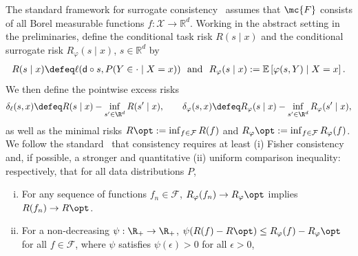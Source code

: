 \documentclass[11pt]{article}
\newcommand{\brk}[1]{\left[{#1}\right]} %
\newcommand{\pred}{\mathsf{d}}  %
\newcommand{\dstr}{P}
\newcommand{\tloss}{\ell}  %
\newcommand{\sloss}{\varphi}  %
\newcommand{\extloss}{\delta_\tloss}
\newcommand{\exsloss}{\delta_\sloss}
\begin{document}
The standard framework for surrogate consistency~\citep{Steinwart07}
assumes that $\mc{F}$ consists of all Borel
measurable functions $f: \mathcal{X} \to \mathbb{R}^d$.
%
%
Working in the abstract setting in the preliminaries, define the
conditional task risk $R(s \mid x)$ and the conditional surrogate risk
$R_\sloss(s \mid x)$, $s \in \mathbb{R}^d$ by
\begin{align*}
  R(s \mid x)
  \defeq \tloss(\pred \circ s, P(Y \in \cdot \mid X = x))
  ~~ \mbox{and} ~~
  R_\sloss(s \mid x) := \mathbb{E}\brk{\sloss(s, Y) \mid X = x}.
\end{align*}
We then define the pointwise excess risks
\begin{align*}
  \extloss(s, x) \defeq R(s \mid x) - \inf_{s' \in \R^d} R(s' \mid x) ,
  \qquad
  \exsloss(s, x) \defeq R_\sloss(s \mid x) -
  \inf_{s' \in \R^d} R_\sloss(s' \mid x),
\end{align*}
as well as the minimal risks $R\opt := \inf_{f \in \mathcal{F}} R(f)$ and
$R_\sloss\opt := \inf_{f \in \mathcal{F}} R_\sloss(f)$.
%
We follow the standard~\citep{Steinwart07,BartlettJoMc06,Zhang04b}
that consistency requires at least (i) Fisher consistency and,
if possible, a stronger and quantitative (ii) uniform comparison inequality:
respectively, that for all data distributions $\dstr$,
\begin{enumerate}[(i)]
\item \label{item:pointwise-comparison}
  For any sequence of functions $f_n \in \mathcal{F}$, $R_\sloss(f_n)
  \to R_\sloss\opt$ implies $R(f_n) \to R\opt$.
\item \label{item:uniform-comparison}
  For a non-decreasing $\psi: \R_+ \to \R_+$, $\psi (R(f) - R\opt) \leq
  R_\sloss(f) - R_\sloss\opt$ for all $f \in \mathcal{F}$, where $\psi$
  satisfies $\psi(\epsilon) > 0$ for all $\epsilon > 0$,
\end{enumerate}
\end{document}
